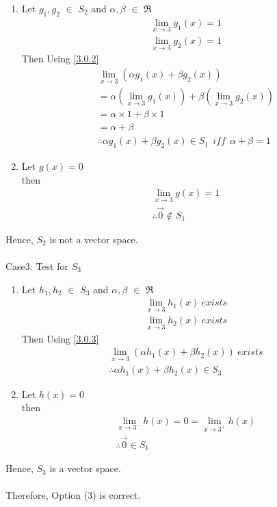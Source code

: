 \documentclass[journal,12pt,twocolumn]{IEEEtran}
\begin{document}
\begin{enumerate}
\item Let $g_1,g_2$ $\in$ $S_2$ and $\alpha,\beta$ $\in$ $\Re$
\begin{equation}\label{3.0.2}
\begin{split}
\lim_{x\to3} g_1(x) = 1\\
\lim_{x\to3} g_2(x) = 1
\end{split}
\end{equation}
Then Using \eqref{3.0.2}
\begin{equation*}
\begin{split}
\lim_{x\to3} (\alpha g_1(x) + \beta g_2(x))\\
= \alpha \left(\lim_{x\to3} g_1(x)\right) + \beta \left(\lim_{x\to3} g_2(x)\right)\\
= \alpha \times 1 + \beta \times 1\\
= \alpha + \beta\\
 \therefore \alpha g_1(x) + \beta g_2(x) \in S_1 ~~iff~~  \alpha + \beta = 1
\end{split}
\end{equation*}
\item Let $g(x) = 0$\\
then 
\begin{equation*}
\begin{split}
\lim_{x\to3} g(x) = 1\\
\therefore \vec{0} \notin S_1
\end{split}
\end{equation*}
\end{enumerate}
Hence, $S_2$ is not a vector space.\\
\\
Case3: Test for $S_3$
\begin{enumerate}
\item Let $h_1,h_2$ $\in$ $S_3$ and $\alpha,\beta$ $\in$ $\Re$
\begin{equation} \label{3.0.3}
\begin{split}
\lim_{x\to3} h_1(x) ~exists\\
\lim_{x\to3} h_2(x) ~exists
\end{split}
\end{equation}
Then Using \eqref{3.0.3}
\begin{equation*}
\begin{split}
\lim_{x\to3} (\alpha h_1(x) + \beta h_2(x)) ~exists\\
 \therefore \alpha h_1(x) + \beta h_2(x) \in S_3
\end{split}
\end{equation*}
\item Let $h(x) = 0$\\
then 
\begin{equation*}
\begin{split}
\lim_{x\to3^-} h(x) = 0 = \lim_{x\to3^+} h(x)\\
\therefore \vec{0} \in S_1
\end{split}
\end{equation*}
\end{enumerate}
Hence, $S_3$ is a vector space.\\
\\
Therefore, Option (3) is correct.
\end{document}
